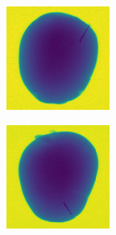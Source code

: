 \documentclass[11pt]{article}
\begin{document}
\begin{figure}[!h]
\begin{subfigure}[b]{0.22\textwidth}
         \caption{}
         \label{fig:metal_25}
     \end{subfigure}
     \hfill
     \begin{subfigure}[b]{0.22\textwidth}
         \centering
         \includegraphics[width=\textwidth]{figurer/potato_dataset/metal/metal_26.jpg}
         \caption{}
         \label{fig:metal_26}
     \end{subfigure}
     \hfill
     \begin{subfigure}[b]{0.22\textwidth}
         \centering
         \includegraphics[width=\textwidth]{figurer/potato_dataset/metal/metal_27.jpg}

\end{subfigure}
\end{figure}
\end{document}
